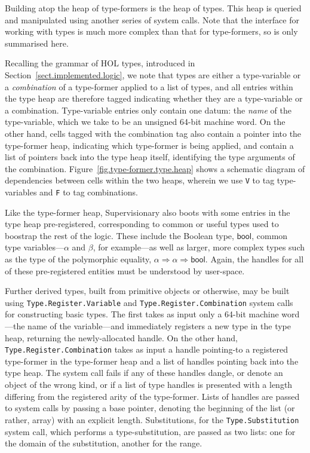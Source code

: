 \documentclass[a4paper, UKenglish, cleveref, autoref, thm-restate, colorlinks]{lipics-v2021}
\begin{document}
Building atop the heap of type-formers is the heap of types.
This heap is queried and manipulated using another series of system calls.
Note that the interface for working with types is much more complex than that for type-formers, so is only summarised here.

Recalling the grammar of HOL types, introduced in Section~\ref{sect.implemented.logic}, we note that types are either a type-variable or a \emph{combination} of a type-former applied to a list of types, and all entries within the type heap are therefore tagged indicating whether they are a type-variable or a combination.
Type-variable entries only contain one datum: the \emph{name} of the type-variable, which we take to be an unsigned 64-bit machine word.
On the other hand, cells tagged with the combination tag also contain a pointer into the type-former heap, indicating which type-former is being applied, and contain a list of pointers back into the type heap itself, identifying the type arguments of the combination.
Figure~\ref{fig.type-former.type.heap} shows a schematic diagram of dependencies between cells within the two heaps, wherein we use \texttt{V} to tag type-variables and \texttt{F} to tag combinations.

Like the type-former heap, Supervisionary also boots with some entries in the type heap pre-registered, corresponding to common or useful types used to boostrap the rest of the logic.
These include the Boolean type, $\mathsf{bool}$, common type variables---$\alpha$ and $\beta$, for example---as well as larger, more complex types such as the type of the polymorphic equality, $\alpha \Rightarrow \alpha \Rightarrow \mathsf{bool}$.
Again, the handles for all of these pre-registered entities must be understood by user-space.

Further derived types, built from primitive objects or otherwise, may be built using \texttt{Type.Register.Variable} and \texttt{Type.Register.Combination} system calls for constructing basic types.
The first takes as input only a 64-bit machine word---the name of the variable---and immediately registers a new type in the type heap, returning the newly-allocated handle.
On the other hand, \texttt{Type.Register.Combination} takes as input a handle pointing-to a registered type-former in the type-former heap and a list of handles pointing back into the type heap.
The system call fails if any of these handles dangle, or denote an object of the wrong kind, or if a list of type handles is presented with a length differing from the registered arity of the type-former.
Lists of handles are passed to system calls by passing a base pointer, denoting the beginning of the list (or rather, array) with an explicit length.
Substitutions, for the \texttt{Type.Substitution} system call, which performs a type-substitution, are passed as two lists: one for the domain of the substitution, another for the range.
\end{document}
